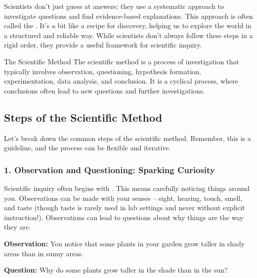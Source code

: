 Scientists don't just guess at answers; they use a systematic approach to investigate questions and find evidence-based explanations. This approach is often called the . It’s a bit like a recipe for discovery, helping us to explore the world in a structured and reliable way.  While scientists don't always follow these steps in a rigid order, they provide a useful framework for scientific inquiry.


\begin{keyconcept}{The Scientific Method}
The scientific method is a process of investigation that typically involves observation, questioning, hypothesis formation, experimentation, data analysis, and conclusion. It is a cyclical process, where conclusions often lead to new questions and further investigations.
\end{keyconcept}

\subsection{Steps of the Scientific Method}

Let's break down the common steps of the scientific method. Remember, this is a guideline, and the process can be flexible and iterative.

\subsubsection{1. Observation and Questioning: Sparking Curiosity}

Scientific inquiry often begins with .  This means carefully noticing things around you.  Observations can be made with your senses – sight, hearing, touch, smell, and taste (though taste is rarely used in lab settings and never without explicit instruction!).  Observations can lead to questions about why things are the way they are.


\begin{example}
\textbf{Observation:} You notice that some plants in your garden grow taller in shady areas than in sunny areas.

\textbf{Question:}  Why do some plants grow taller in the shade than in the sun?
\end{example}

